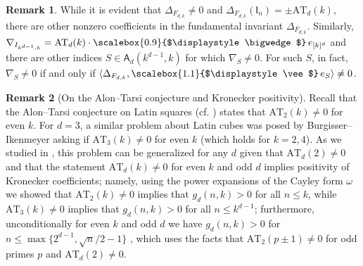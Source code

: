 \documentclass[12pt, reqno]{amsart}
\newtheorem{proposition}[theorem]{Proposition}
\newtheorem{corollary}[theorem]{Corollary}
\theoremstyle{definition}
\newtheorem{remark}{Remark}[section]
\let\oldbigwedge\bigwedge
\let\oldvee\vee
\renewcommand{\bigwedge}{
  \mathop{
    \vcenter{
      \hbox{\scalebox{0.9}{$\displaystyle\oldbigwedge$}}
    }
  }
}
\renewcommand{\vee}{
  \mathop{
    \vcenter{
      \hbox{\scalebox{1.1}{$\displaystyle\oldvee$}}
    }
  }
}
\begin{document}
    \begin{remark}
        While it is evident that $\Delta_{F_{d,k}} \neq 0$ and $\Delta_{F_{d,k}}(\mathsf{I}_n) = \pm \mathrm{AT}_{d}(k)$, there are other nonzero coefficients in the fundamental invariant $\Delta_{F_{d,k}}$. Similarly, $\nabla_{I_{k^{d-1}, k}} = \mathrm{AT}_d(k) \cdot \bigwedge e_{[k]^d}$ and there are other indices $S \in \mathsf{A}_d(k^{d-1}, k)$ for which $\nabla_{S} \neq 0$. For such $S$, in fact, $\nabla_S \neq 0$ if and only if $\langle \Delta_{F_{d,k}}, \vee e_S \rangle \neq 0$.    
    \end{remark}
    
\begin{remark}[On the Alon--Tarsi conjecture and Kronecker positivity]    
    Recall that the Alon--Tarsi conjecture on Latin squares \cite{at} (cf. \cite{hr}) %
    states that $\mathrm{AT}_2(k) \neq 0$ for even $k$. For $d = 3$, a similar problem about Latin cubes was posed by Burgisser--Ikenmeyer \cite{bi} asking if $\mathrm{AT}_3(k) \neq 0$ for even $k$ (which holds for $k = 2,4$). As we studied in \cite{ayfund}, this problem can be generalized for any $d$ given that $\mathrm{AT}_d(2) \ne 0$  and that the statement $\mathrm{AT}_d(k) \ne 0$ for even $k$ and odd $d$ implies positivity of Kronecker coefficients; namely, using the power expansions of the Cayley form $\omega$ we showed that $\mathrm{AT}_2(k) \ne 0$ implies that $g_d(n,k) > 0$ for all $n \le k$, while $\mathrm{AT}_3(k) \ne 0$ implies that $g_d(n,k) > 0$ for all $n \le k^{d-1}$; furthermore, unconditionally for even $k$ and odd $d$ we have $g_d(n,k) > 0$ for $n \le \max\{2^{d-1}, \sqrt{n}/2 - 1 \}$ \cite{ayfund, ayuni}, which uses the facts that $\mathrm{AT}_2(p \pm 1) \ne 0$ for odd primes $p$ \cite{dri1, glynn} and $\mathrm{AT}_d(2) \ne 0$. 
\end{remark}
    


\end{document}
